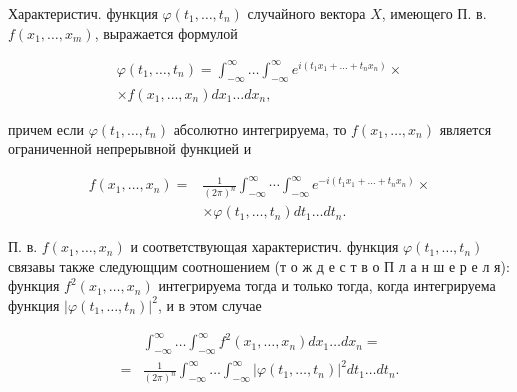 \documentclass[10pt]{article}
\begin{document}
Характеристич. функция $\varphi\left(t_{1}, \ldots, t_{n}\right)$ случайного вектора $X$, имеющего П. в. $f\left(x_{1}, \ldots, x_{m}\right)$, выражается формулой



\[

\begin{gathered}

\varphi\left(t_{1}, \ldots, t_{n}\right)=\int_{-\infty}^{\infty} \ldots \int_{-\infty}^{\infty} e^{i\left(t_{1} x_{1}+\ldots+t_{n} x_{n}\right)} \times \\

\times f\left(x_{1}, \ldots, x_{n}\right) d x_{1} \ldots d x_{n},

\end{gathered}

\]



причем если $\varphi\left(t_{1}, \ldots, t_{n}\right)$ абсолютно интегрируема, то $f\left(x_{1}, \ldots, x_{n}\right)$ является ограниченной непрерывной функцией и



\[

\begin{aligned}

f\left(x_{1}, \ldots, x_{n}\right)= & \frac{1}{(2 \pi)^{n}} \int_{-\infty}^{\infty} \cdots \int_{-\infty}^{\infty} e^{-i\left(t_{1} x_{1}+\ldots+t_{n} x_{n}\right)} \times \\

& \times \varphi\left(t_{1}, \ldots, t_{n}\right) d t_{1} \ldots d t_{n} .

\end{aligned}

\]



П. в. $f\left(x_{1}, \ldots, x_{n}\right)$ и соответствующая характеристич. функция $\varphi\left(t_{1}, \ldots, t_{n}\right)$ связавы также следующцим соотношением (т о ж д е с т в о П л а н ш е р е л я): функция $f^{2}\left(x_{1}, \ldots, x_{n}\right)$ интегрируема тогда и только тогда, когда интегрируема функция $\left|\varphi\left(t_{1}, \ldots, t_{n}\right)\right|^{2}$, и в этом случае



\[

\begin{aligned}

& \int_{-\infty}^{\infty} \ldots \int_{-\infty}^{\infty} f^{2}\left(x_{1}, \ldots, x_{n}\right) d x_{1} \ldots d x_{n}= \\

= & \frac{1}{(2 \pi)^{n}} \int_{-\infty}^{\infty} \ldots \int_{-\infty}^{\infty}\left|\varphi\left(t_{1}, \ldots, t_{n}\right)\right|^{2} d t_{1} \ldots d t_{n} .

\end{aligned}

\]
\end{document}
